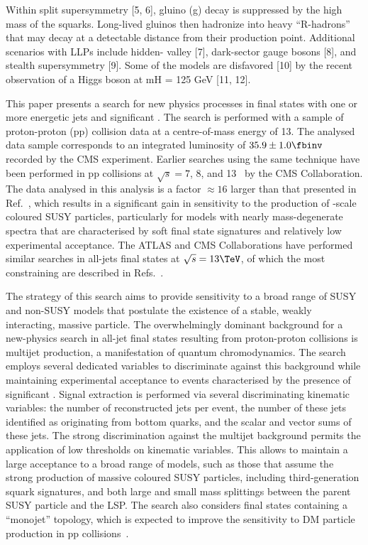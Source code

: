 Within split supersymmetry [5, 6], gluino (g) decay is suppressed by
the high mass of the squarks. Long-lived gluinos then hadronize into
heavy ``R-hadrons'' that may decay at a detectable distance from their
production point. Additional scenarios with LLPs include hidden-
valley [7], dark-sector gauge bosons [8], and stealth supersymmetry
[9]. Some of the models are disfavored [10] by the recent observation
of a Higgs boson at mH = 125 GeV [11, 12].


This paper presents a search for new physics processes in final states
with one or more energetic jets and significant \ptvecmiss. The search
is performed with a sample of proton-proton (pp) collision data at a
centre-of-mass energy of 13\TeV. The analysed data sample corresponds
to an integrated luminosity of $35.9 \pm 1.0 \fbinv$ recorded by the
CMS experiment. Earlier searches using the same technique have been
performed in pp collisions at $\sqrt{s} = 7$, 8, and
13\TeV~\cite{RA1Paper, RA1Paper2011, RA1Paper2011FULL, RA1Paper2012,
  RA1Parked, Khachatryan:2016dvc} by the CMS Collaboration. The data
analysed in this analysis is a factor ${\approx}16$ larger than that
presented in Ref.~\cite{Khachatryan:2016dvc}, which results in a
significant gain in sensitivity to the production of \TeV-scale
coloured SUSY particles, particularly for models with nearly
mass-degenerate spectra that are characterised by soft final state
signatures and relatively low experimental acceptance. The ATLAS and
CMS Collaborations have performed similar searches in all-jets final
states at $\sqrt{s} = 13\TeV$, of which the most constraining are
described in Refs.~\cite{}.

The strategy of this search aims to provide sensitivity to a broad
range of SUSY and non-SUSY models that postulate the existence of a
stable, weakly interacting, massive particle. The overwhelmingly
dominant background for a new-physics search in all-jet final states
resulting from proton-proton collisions is multijet production, a
manifestation of quantum chromodynamics. The search employs several
dedicated variables to discriminate against this background while
maintaining experimental acceptance to events characterised by the
presence of significant \ptvecmiss. Signal extraction is performed via
several discriminating kinematic variables: the number of
reconstructed jets per event, the number of these jets identified as
originating from bottom quarks, and the scalar and vector \pt sums of
these jets. The strong discrimination against the multijet background
permits the application of low thresholds on kinematic variables. This
allows to maintain a large acceptance to a broad range of models, such
as those that assume the strong production of massive coloured SUSY
particles, including third-generation squark signatures, and both
large and small mass splittings between the parent SUSY particle and
the LSP. The search also considers final states containing a
``monojet'' topology, which is expected to improve the sensitivity to
DM particle production in pp collisions~\cite{Fox:2012ee,
  Buchmueller:2015eea}.

